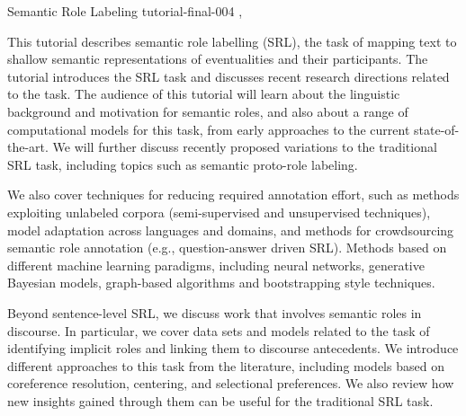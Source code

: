 \begin{tutorial}
  {Semantic Role Labeling}
  {tutorial-final-004}
  {\daydateyear, \tutorialafternoontime}
  {\TutLocD}

  This tutorial describes semantic role labelling (SRL), the task of mapping text to shallow semantic representations of eventualities and their participants. The tutorial introduces the SRL task and discusses recent research directions related to the task. The audience of this tutorial will learn about the linguistic background and motivation for semantic roles, and also about a range of computational models for this task, from early approaches to the current state-of-the-art. We will further discuss recently proposed variations to the traditional SRL task, including topics such as semantic proto-role labeling.

We also cover techniques for reducing required annotation effort, such as methods exploiting unlabeled corpora (semi-supervised and unsupervised techniques), model adaptation across languages and domains, and methods for crowdsourcing semantic role annotation (e.g., question-answer driven SRL). Methods based on different machine learning paradigms, including neural networks, generative Bayesian models, graph-based algorithms and bootstrapping style techniques.

Beyond sentence-level SRL, we discuss work that involves semantic roles in discourse. In particular, we cover data sets and models related to the task of identifying implicit roles and linking them to discourse antecedents. We introduce different approaches to this task from the literature, including models based on coreference resolution, centering, and selectional preferences. We also review how new insights gained through them can be useful for the traditional SRL task.

\end{tutorial}
